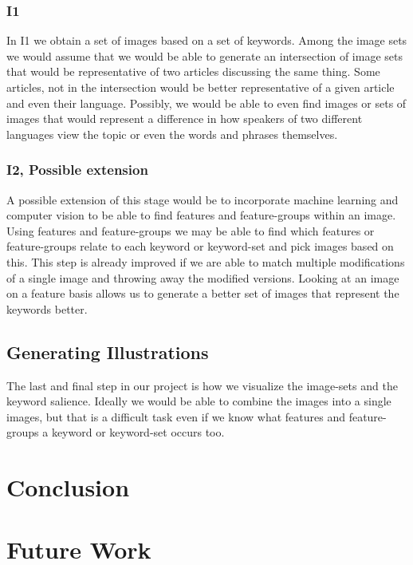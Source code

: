 \documentclass[12pt]{article}
\begin{document}
\subsubsection{I1}
In I1 we obtain a set of images based on a set of keywords. Among the image sets we would assume that we would 
be able to generate an intersection of image sets that would be representative of two articles discussing the 
same thing. Some articles, not in the intersection would be better representative of a given article and even their language. 
Possibly, we would be able to even find images or sets of images that would represent a difference in how speakers of two different languages
view the topic or even the words and phrases themselves.

\subsubsection{I2, Possible extension}
A possible extension of this stage would be to incorporate machine learning and computer vision to be able to find features and feature-groups within an image. Using features and feature-groups we may be able to find which features or feature-groups relate to each keyword or keyword-set and pick images based on this. This step is already improved if we are able to match multiple modifications of a single image and throwing away the modified versions. Looking at an image on a feature basis allows
us to generate a better set of images that represent the keywords better.

\subsection{Generating Illustrations}
The last and final step in our project is how we visualize the image-sets and the keyword salience. Ideally we would be able to combine the images into a single images, but that is a difficult task even if we know what features and feature-groups a keyword or keyword-set occurs too.

\section{Conclusion}

\section{Future Work}
\end{document}

